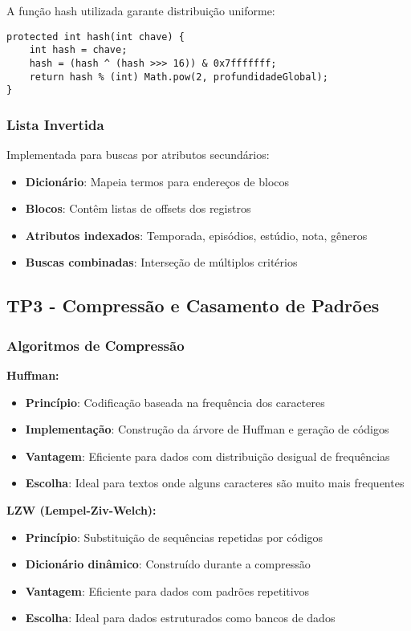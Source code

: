 \documentclass[12pt,a4paper]{article}
\let\oldsubsection\subsection
\renewcommand{\subsection}[1]{\needspace{3\baselineskip}\oldsubsection{#1}}
\begin{document}
A função hash utilizada garante distribuição uniforme:
\begin{lstlisting}[style=javastyle]
protected int hash(int chave) {
    int hash = chave;
    hash = (hash ^ (hash >>> 16)) & 0x7fffffff;
    return hash % (int) Math.pow(2, profundidadeGlobal);
}
\end{lstlisting}

\subsubsection{Lista Invertida}

Implementada para buscas por atributos secundários:

\begin{itemize}
    \item \textbf{Dicionário}: Mapeia termos para endereços de blocos
    \item \textbf{Blocos}: Contêm listas de offsets dos registros
    \item \textbf{Atributos indexados}: Temporada, episódios, estúdio, nota, gêneros
    \item \textbf{Buscas combinadas}: Interseção de múltiplos critérios
\end{itemize}

\subsection{TP3 - Compressão e Casamento de Padrões}

\subsubsection{Algoritmos de Compressão}

\textbf{Huffman:}
\begin{itemize}
    \item \textbf{Princípio}: Codificação baseada na frequência dos caracteres
    \item \textbf{Implementação}: Construção da árvore de Huffman e geração de códigos
    \item \textbf{Vantagem}: Eficiente para dados com distribuição desigual de frequências
    \item \textbf{Escolha}: Ideal para textos onde alguns caracteres são muito mais frequentes
\end{itemize}

\textbf{LZW (Lempel-Ziv-Welch):}
\begin{itemize}
    \item \textbf{Princípio}: Substituição de sequências repetidas por códigos
    \item \textbf{Dicionário dinâmico}: Construído durante a compressão
    \item \textbf{Vantagem}: Eficiente para dados com padrões repetitivos
    \item \textbf{Escolha}: Ideal para dados estruturados como bancos de dados
\end{itemize}
\end{document}
